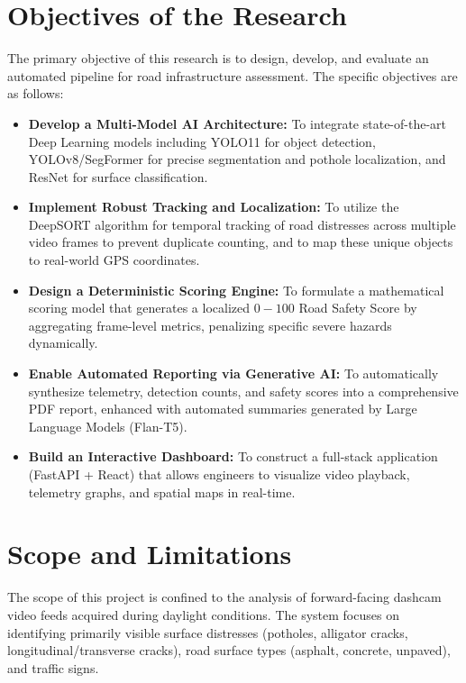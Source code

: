 \section{Objectives of the Research}
The primary objective of this research is to design, develop, and evaluate an automated pipeline for road infrastructure assessment. The specific objectives are as follows:
\begin{itemize}
    \item \textbf{Develop a Multi-Model AI Architecture:} To integrate state-of-the-art Deep Learning models including YOLO11 for object detection, YOLOv8/SegFormer for precise segmentation and pothole localization, and ResNet for surface classification.
    \item \textbf{Implement Robust Tracking and Localization:} To utilize the DeepSORT algorithm for temporal tracking of road distresses across multiple video frames to prevent duplicate counting, and to map these unique objects to real-world GPS coordinates.
    \item \textbf{Design a Deterministic Scoring Engine:} To formulate a mathematical scoring model that generates a localized $0-100$ Road Safety Score by aggregating frame-level metrics, penalizing specific severe hazards dynamically.
    \item \textbf{Enable Automated Reporting via Generative AI:} To automatically synthesize telemetry, detection counts, and safety scores into a comprehensive PDF report, enhanced with automated summaries generated by Large Language Models (Flan-T5).
    \item \textbf{Build an Interactive Dashboard:} To construct a full-stack application (FastAPI + React) that allows engineers to visualize video playback, telemetry graphs, and spatial maps in real-time.
\end{itemize}

\section{Scope and Limitations}
The scope of this project is confined to the analysis of forward-facing dashcam video feeds acquired during daylight conditions. The system focuses on identifying primarily visible surface distresses (potholes, alligator cracks, longitudinal/transverse cracks), road surface types (asphalt, concrete, unpaved), and traffic signs. 

